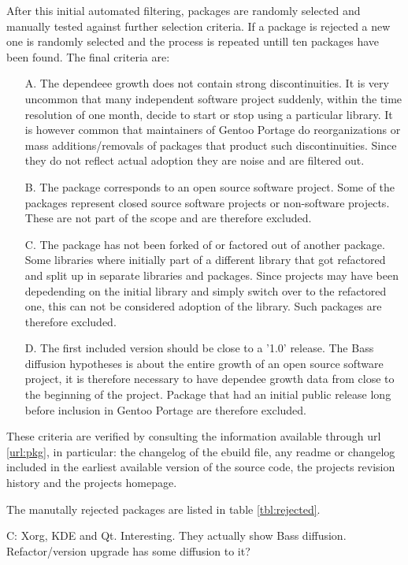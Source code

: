 \documentclass[smallextended,final]{svjour3}
\begin{document}
After this initial automated filtering, packages are randomly selected and manually tested against further selection criteria. If a package is rejected a new one is randomly selected and the process is repeated untill ten packages have been found. The final criteria are:

\begin{enumerate}
	\item[A.] The dependeee growth does not contain strong discontinuities. It is very uncommon that many independent software project suddenly, within the time resolution of one month, decide to start or stop using a particular library. It is however common that maintainers of Gentoo Portage do reorganizations or mass additions/removals of packages that product such discontinuities. Since they do not reflect actual adoption they are noise and are filtered out.
	\item[B.] The package corresponds to an open source software project. Some of the packages represent closed source software projects or non-software projects. These are not part of the scope and are therefore excluded.
	\item[C.] The package has not been forked of or factored out of another package. Some libraries where initially part of a different library that got refactored and split up in separate libraries and packages. Since projects may have been depedending on the initial library and simply switch over to the refactored one, this can not be considered adoption of the library. Such packages are therefore excluded.
	\item[D.] The first included version should be close to a '1.0' release. The Bass diffusion hypotheses is about the entire growth of an open source software project, it is therefore necessary to have dependee growth data from close to the beginning of the project. Package that had an initial public release long before inclusion in Gentoo Portage are therefore excluded.
\end{enumerate}

These criteria are verified by consulting the information available through url \eqref{url:pkg}, in particular: the changelog of the ebuild file, any readme or changelog included in the earliest available version of the source code, the projects revision history and the projects homepage.

The manutally rejected packages are listed in table \ref{tbl:rejected}.

C: Xorg, KDE and Qt. Interesting. They actually show Bass diffusion. Refactor/version upgrade has some diffusion to it?
\end{document}
